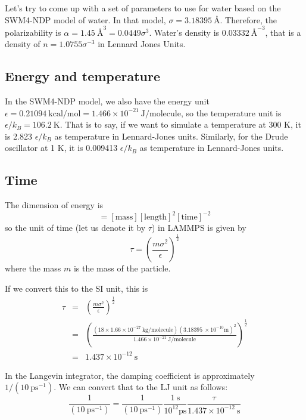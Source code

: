 \documentclass[aps, 12pt, amsmath, amssymb, onecolumn, notitlepage, nofootinbib]{revtex4-1}
\begin{document}
Let's try to come up with a set of parameters to use for water based on the SWM4-NDP model of water. In that model, $\sigma = 3.18395\ \text{\AA}$. Therefore, the polarizability is $\alpha = 1.45\ \text{\AA}^3 = 0.0449 \sigma^3$. Water's density is $0.03332\ \text{\AA}^{-3}$, that is a density of $n = 1.0755 \sigma^{-3}$ in Lennard Jones Units.


\subsection{Energy and temperature}

In the SWM4-NDP model, we also have the energy unit $\epsilon = 0.21094\ \text{kcal/mol} = 1.466 \times 10^{-21}\ \text{J/molecule}$, so the temperature unit is $\epsilon/k_B = 106.2\ \text{K}$. That is to say, if we want to simulate a temperature at 300 K, it is 2.823 $\epsilon/k_B$ as temperature in Lennard-Jones units. Similarly, for the Drude oscillator at 1 K, it is 0.009413  $\epsilon/k_B$ as temperature in Lennard-Jones units.
 

\subsection{Time}

The dimension of energy is 
\begin{equation}
[\text{energy}] = [\text{mass}][\text{length}]^2[\text{time}]^{-2}
\end{equation}
so the unit of time (let us denote it by $\tau$) in LAMMPS is given by
\begin{equation}
\tau = \left(\frac{m \sigma^2}{\epsilon}\right)^\frac{1}{2} 
\label{tau}
\end{equation}
where the mass $m$ is the mass of the particle.

If we convert this to the SI unit, this is
\begin{eqnarray}
\tau &=&  \left(\frac{m \sigma^2}{\epsilon}\right)^\frac{1}{2} \nonumber\\
&=& \left(\frac{(18 \times 1.66 \times 10^{-27}\ \text{kg/molecule} ) (3.18395\ \times 10^{-10} \text{m})^2}{1.466 \times 10^{-21}\ \text{J/molecule} }\right)^\frac{1}{2} \nonumber\\
&=& 1.437 \times 10^{-12}\ \text{s} 
\end{eqnarray}

In the Langevin integrator, the damping coefficient is approximately $1/(10\ \text{ps}^{-1})$. We can convert that to the LJ unit as follows:
\begin{equation}
\frac{1}{(10\ \text{ps}^{-1})} = \frac{1}{(10\ \text{ps}^{-1})} \frac{1\ \text{s}}{10^{12} \text{ps}}  \frac{\tau}{ 1.437 \times 10^{-12}\ \text{s}}
\end{equation}
%






\end{document}
